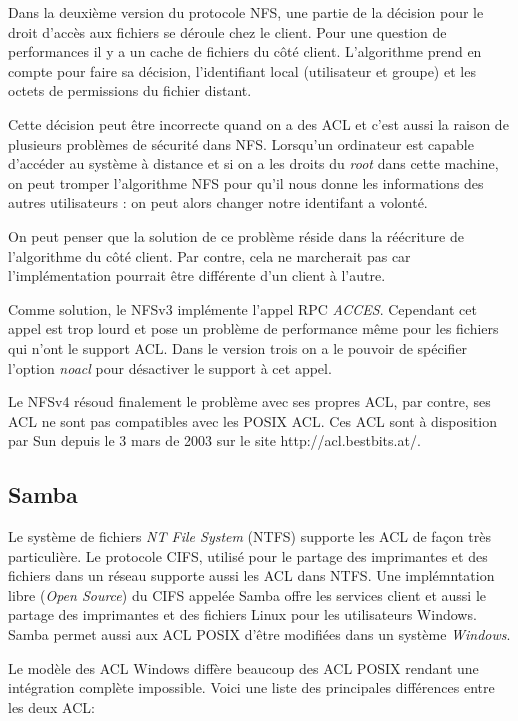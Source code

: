 \documentclass{article}
\begin{document}
Dans la deuxième version du protocole NFS, une partie de la décision pour le droit d'accès aux fichiers se déroule chez le client. Pour une question de performances il y a un cache de fichiers du côté client. L'algorithme prend en compte pour faire sa décision, l'identifiant local (utilisateur et groupe) et les octets de permissions du fichier distant. 

Cette décision peut être incorrecte quand on a des ACL et c'est aussi la raison de plusieurs problèmes de sécurité dans NFS. Lorsqu'un ordinateur est capable d'accéder au système à distance et si on a les droits du \emph{root} dans cette machine, on peut tromper l'algorithme NFS pour qu'il nous donne les informations des autres utilisateurs : on peut alors changer notre identifant a volonté.

On peut penser que la solution de ce problème réside dans la réécriture de l'algorithme du côté client. Par contre, cela ne marcherait pas car l'implémentation pourrait être différente d'un client à l'autre. 

Comme solution, le NFSv3 implémente l'appel RPC \emph{ACCES}. Cependant cet appel est trop lourd et pose un problème de performance même pour les fichiers qui n'ont le support ACL. Dans le version trois on a le pouvoir de spécifier l'option \emph{noacl} pour désactiver le support à cet appel. 

Le NFSv4 résoud finalement le problème avec ses propres ACL, par contre, ses ACL ne sont pas compatibles avec les POSIX ACL. Ces ACL sont à disposition par Sun depuis le 3 mars de 2003 sur le site http://acl.bestbits.at/. 

\subsection{Samba}
Le système de fichiers \emph{NT File System} (NTFS) supporte les ACL de façon très particulière. Le protocole CIFS\cite{cifs}, utilisé pour le partage des imprimantes et des fichiers dans un réseau supporte aussi les ACL dans NTFS. Une implémntation libre (\emph{Open Source}) du CIFS appelée Samba offre les services client et aussi le partage des imprimantes et des fichiers Linux pour les utilisateurs Windows. Samba permet aussi aux ACL POSIX d'être modifiées dans un système \emph{Windows}.  

Le modèle des ACL Windows diffère beaucoup des ACL POSIX rendant une intégration complète impossible. Voici une liste des principales différences entre les deux ACL:
\end{document}
